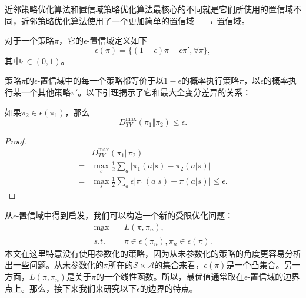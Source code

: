 近邻策略优化算法和置信域策略优化算法最核心的不同就是它们所使用的置信域不同，近邻策略优化算法使用了一个更加简单的置信域——$\epsilon$-置信域。
\begin{definition}
    对于一个策略$\pi$，它的$\epsilon$-置信域定义如下
    \begin{equation}
        \epsilon(\pi) = \{(1 - \epsilon) \pi + \epsilon \pi', \forall \pi\},
    \end{equation}
    其中$\epsilon \in (0, 1)$。
\end{definition}
策略$\pi$的$\epsilon$-置信域中的每一个策略都等价于以$1 - \epsilon$的概率执行策略$\pi$，以$\epsilon$的概率执行某一个其他策略$\pi'$。以下引理揭示了它和最大全变分差异的关系：
\begin{lemma}
    如果$\pi_2 \in \epsilon(\pi_1)$，那么
    \begin{equation}
        D^{\max}_{TV}(\pi_1 \Vert \pi_2) \le \epsilon.
    \end{equation}
\end{lemma}
\begin{proof}
    \begin{align*}
        &D^{\max}_{TV}(\pi_1 \Vert \pi_2) \\
        =& \max_{s} \frac{1}{2} \sum_{a} \vert \pi_1 (a \vert s) - \pi_2(a \vert s) \vert \\
        =& \max_{s} \frac{1}{2} \sum_{a} \epsilon \vert \pi_1 (a \vert s) - \pi(a \vert s) \vert \le \epsilon.
    \end{align*}
\end{proof}

从$\epsilon$-置信域中得到启发，我们可以构造一个新的受限优化问题：
\begin{equation}
    \begin{aligned}
    \max_{\pi}&\quad L(\pi, \pi_n),\\
    s.t.&\quad \pi \in \epsilon(\pi_n), \pi_n \in \epsilon(\pi).
    \end{aligned}
\end{equation}
本文在这里特意没有使用参数化的策略，因为从未参数化的策略的角度更容易分析出一些问题。从未参数化的$\pi$所在的$\mathcal{S}\times\mathcal{A}$的集合来看，$\epsilon(\pi)$是一个凸集合。另一方面，$L(\pi, \pi_n)$是关于$\pi$的一个线性函数。所以，最优值通常取在$\epsilon$-置信域的边界点上。那么，接下来我们来研究以下$\epsilon$的边界的特点。

